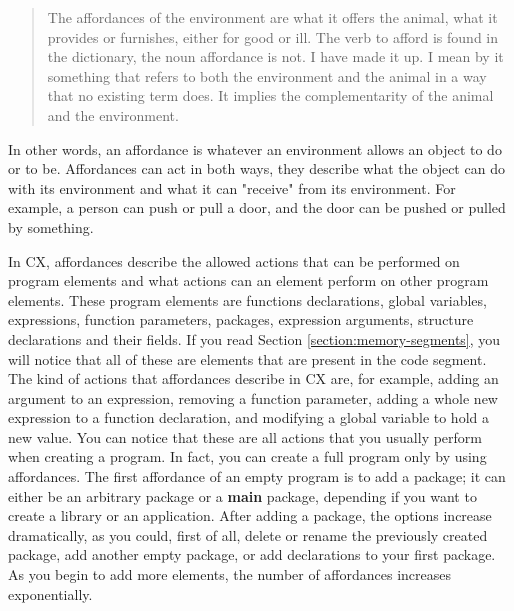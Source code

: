 \documentclass[11pt,fleqn,openany]{book} %
\begin{document}
\begin{quote}
The affordances of the environment are what it offers the animal, what it provides or furnishes, either for good or ill. The verb to afford is found in the dictionary, the noun affordance is not. I have made it up. I mean by it something that refers to both the environment and the animal in a way that no existing term does. It implies the complementarity of the animal and the environment.
\end{quote}

In other words, an affordance is whatever an environment allows an object to do or to be. Affordances can act in both ways, they describe what the object can do with its environment and what it can "receive" from its environment. For example, a person can push or pull a door, and the door can be pushed or pulled by something.

In CX, affordances describe the allowed actions that can be performed on program elements and what actions can an element perform on other program elements. These program elements are functions declarations, global variables, expressions, function parameters, packages, expression arguments, structure declarations and their fields. If you read Section \ref{section:memory-segments}, you will notice that all of these are elements that are present in the code segment. The kind of actions that affordances describe in CX are, for example, adding an argument to an expression, removing a function parameter, adding a whole new expression to a function declaration, and modifying a global variable to hold a new value. You can notice that these are all actions that you usually perform when creating a program. In fact, you can create a full program only by using affordances. The first affordance of an empty program is to add a package; it can either be an arbitrary package or a \textbf{main} package, depending if you want to create a library or an application. After adding a package, the options increase dramatically, as you could, first of all, delete or rename the previously created package, add another empty package, or add declarations to your first package. As you begin to add more elements, the number of affordances increases exponentially.
\end{document}
